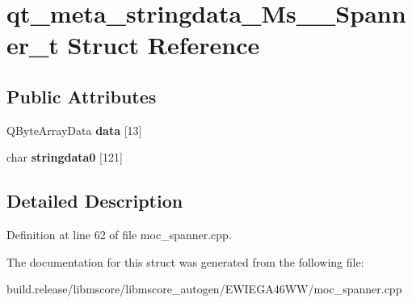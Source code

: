 \hypertarget{structqt__meta__stringdata___ms_____spanner__t}{}\section{qt\+\_\+meta\+\_\+stringdata\+\_\+\+Ms\+\_\+\+\_\+\+Spanner\+\_\+t Struct Reference}
\label{structqt__meta__stringdata___ms_____spanner__t}
\subsection*{Public Attributes}
\begin{DoxyCompactItemize}
\item 
\mbox{\label{structqt__meta__stringdata___ms_____spanner__t_a78598813f77e9eb53c516d82ed527b43}} 
Q\+Byte\+Array\+Data {\bfseries data} \mbox{[}13\mbox{]}
\item 
\mbox{\label{structqt__meta__stringdata___ms_____spanner__t_a3b54438408de2505226719066aa04064}} 
char {\bfseries stringdata0} \mbox{[}121\mbox{]}
\end{DoxyCompactItemize}


\subsection{Detailed Description}


Definition at line 62 of file moc\+\_\+spanner.\+cpp.



The documentation for this struct was generated from the following file\+:\begin{DoxyCompactItemize}
\item 
build.\+release/libmscore/libmscore\+\_\+autogen/\+E\+W\+I\+E\+G\+A46\+W\+W/moc\+\_\+spanner.\+cpp\end{DoxyCompactItemize}
